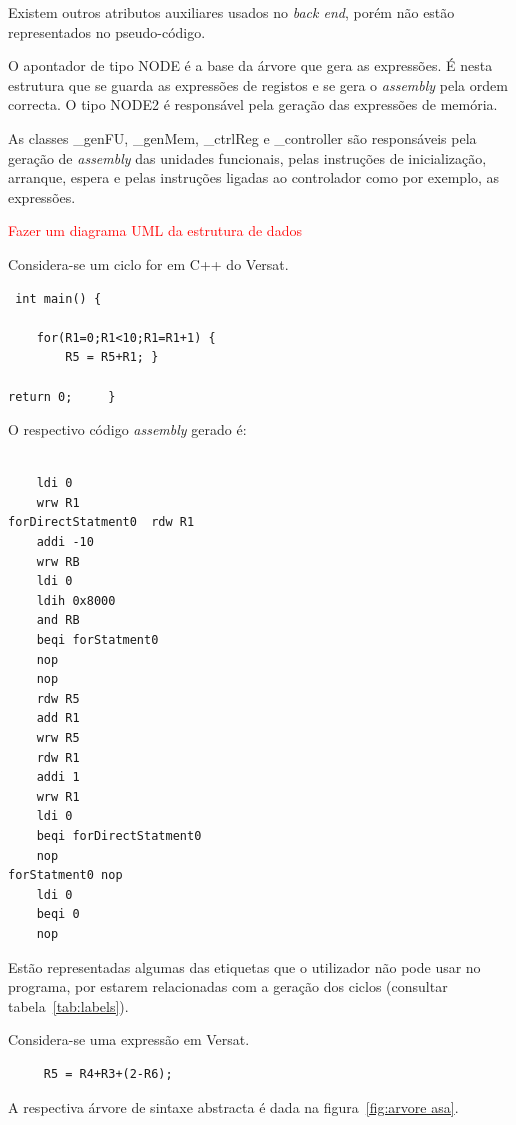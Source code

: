 Existem outros atributos auxiliares usados no {\it back end}, porém não estão representados no pseudo-código.

O apontador de tipo NODE é a base da árvore que gera as expressões. É nesta estrutura que se guarda as expressões de registos e se gera o {\it assembly} pela ordem correcta.
O tipo NODE2 é responsável pela geração das expressões de memória. 

As classes \_genFU, \_genMem, \_ctrlReg e \_controller são responsáveis pela geração de {\it assembly} das unidades funcionais, pelas instruções de inicialização, arranque, espera e pelas instruções ligadas ao controlador como por exemplo, as expressões.

\textcolor{red}{Fazer um diagrama UML da estrutura de dados  }

Considera-se um ciclo for em C++ do Versat.

\begin{lstlisting}
 int main() {

	for(R1=0;R1<10;R1=R1+1) {
		R5 = R5+R1; }
		
return 0;     }
\end{lstlisting}

O respectivo código {\it assembly} gerado é:

\begin{lstlisting}
 
	ldi 0
	wrw R1
forDirectStatment0	rdw R1
	addi -10
	wrw RB
	ldi 0
	ldih 0x8000
	and RB
	beqi forStatment0
	nop 
	nop 
	rdw R5
	add R1
	wrw R5
	rdw R1
	addi 1
	wrw R1
	ldi 0
	beqi forDirectStatment0
	nop 
forStatment0 nop
	ldi 0
	beqi 0
	nop

\end{lstlisting}

Estão representadas algumas das etiquetas que o utilizador não pode usar no programa, por estarem relacionadas com a geração dos ciclos (consultar tabela~\ref{tab:labels}).

Considera-se uma expressão em Versat.

\begin{lstlisting} 
     R5 = R4+R3+(2-R6);   
\end{lstlisting} 

A respectiva árvore de sintaxe abstracta é dada na figura~\ref{fig:arvore asa}.

